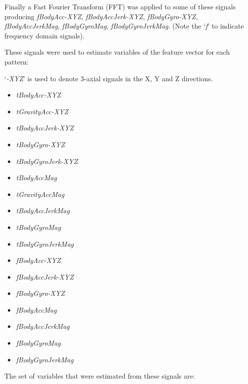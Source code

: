 \documentclass[
]{article}
\begin{document}
Finally a Fast Fourier Transform (FFT) was applied to some of these
signals producing \emph{fBodyAcc-XYZ}, \emph{fBodyAccJerk-XYZ},
\emph{fBodyGyro-XYZ}, \emph{fBodyAccJerkMag}, \emph{fBodyGyroMag},
\emph{fBodyGyroJerkMag}. (Note the `\emph{f}' to indicate frequency
domain signals).

These signals were used to estimate variables of the feature vector for
each pattern:

`\emph{-XYZ}' is used to denote 3-axial signals in the X, Y and Z
directions.

\begin{itemize}
\item
  \emph{tBodyAcc-XYZ}
\item
  \emph{tGravityAcc-XYZ}
\item
  \emph{tBodyAccJerk-XYZ}
\item
  \emph{tBodyGyro-XYZ}
\item
  \emph{tBodyGyroJerk-XYZ}
\item
  \emph{tBodyAccMag}
\item
  \emph{tGravityAccMag}
\item
  \emph{tBodyAccJerkMag}
\item
  \emph{tBodyGyroMag}
\item
  \emph{tBodyGyroJerkMag}
\item
  \emph{fBodyAcc-XYZ}
\item
  \emph{fBodyAccJerk-XYZ}
\item
  \emph{fBodyGyro-XYZ}
\item
  \emph{fBodyAccMag}
\item
  \emph{fBodyAccJerkMag}
\item
  \emph{fBodyGyroMag}
\item
  \emph{fBodyGyroJerkMag}
\end{itemize}

The set of variables that were estimated from these signals are:
\end{document}
